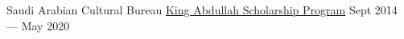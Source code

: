 

\begin{cventries}

  \cventrynodesc
    {Saudi Arabian Cultural Bureau} %
    {\href{https://www.saudibureau.org/en/inside.php?ID=16}{King Abdullah Scholarship Program}} %
    {} %
    {Sept 2014 — May 2020} %

\end{cventries}
